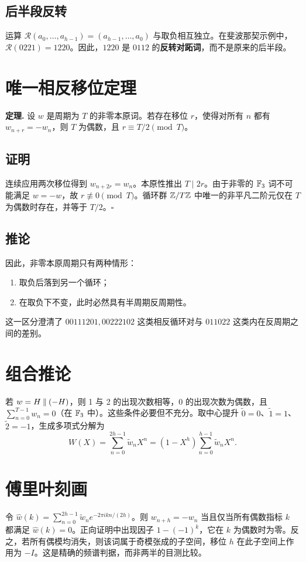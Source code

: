\documentclass[11pt,a4paper]{article}
\begin{document}
\subsection{后半段反转}
运算 \(\mathcal R(a_0,\ldots,a_{h-1})=(a_{h-1},\ldots,a_0)\) 与取负相互独立。在斐波那契示例中，\(\mathcal R(0221)=1220\)。因此，\(1220\) 是 \(0112\) 的\textbf{反转对跖词}，而不是原来的后半段。
\section{唯一相反移位定理}
\begin{summarybox}\textbf{定理.} 设 \(w\) 是周期为 \(T\) 的非零本原词。若存在移位 \(r\)，使得对所有 \(n\) 都有 \(w_{n+r}=-w_n\)，则 \(T\) 为偶数，且 \(r\equiv T/2\pmod T\)。\end{summarybox}
\subsection*{证明}
连续应用两次移位得到 \(w_{n+2r}=w_n\)。本原性推出 \(T\mid2r\)。由于非零的 \(\mathbb F_3\) 词不可能满足 \(w=-w\)，故 \(r\not\equiv0\pmod T\)。循环群 \(\mathbb Z/T\mathbb Z\) 中唯一的非平凡二阶元仅在 \(T\) 为偶数时存在，并等于 \(T/2\)。\hfill\(\square\)
\subsection*{推论}
因此，非零本原周期只有两种情形：\begin{enumerate}\item 取负后落到另一个循环；\item 在取负下不变，此时必然具有半周期反周期性。\end{enumerate} 这一区分澄清了 \(00111201,00222102\) 这类相反循环对与 \(011022\) 这类内在反周期之间的差别。
\section{组合推论}
若 \(w=H\mathbin{\Vert}(-H)\)，则 1 与 2 的出现次数相等，0 的出现次数为偶数，且 \(\sum_{n=0}^{T-1}w_n=0\)（在 \(\mathbb F_3\) 中）。这些条件必要但不充分。取中心提升 \(\widetilde0=0\)、\(\widetilde1=1\)、\(\widetilde2=-1\)，生成多项式分解为 \[W(X)=\sum_{n=0}^{2h-1}\widetilde w_nX^n=(1-X^h)\sum_{n=0}^{h-1}\widetilde w_nX^n.\]
\section{傅里叶刻画}
令 \(\widehat w(k)=\sum_{n=0}^{2h-1}\widetilde w_ne^{-2\pi i kn/(2h)}\)。则 \(w_{n+h}=-w_n\) 当且仅当所有偶数指标 \(k\) 都满足 \(\widehat w(k)=0\)。正向证明中出现因子 \(1-(-1)^k\)，它在 \(k\) 为偶数时为零。反之，若所有偶模均消失，则该词属于奇模张成的子空间，移位 \(h\) 在此子空间上作用为 \(-I\)。这是精确的频谱判据，而非两半的目测比较。
\end{document}
